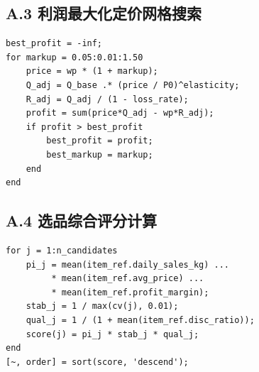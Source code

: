 \documentclass[12pt,a4paper]{ctexart}
\begin{document}
\subsection*{A.3 利润最大化定价网格搜索}
\begin{lstlisting}
best_profit = -inf;
for markup = 0.05:0.01:1.50
    price = wp * (1 + markup);
    Q_adj = Q_base .* (price / P0)^elasticity;
    R_adj = Q_adj / (1 - loss_rate);
    profit = sum(price*Q_adj - wp*R_adj);
    if profit > best_profit
        best_profit = profit;
        best_markup = markup;
    end
end
\end{lstlisting}

\subsection*{A.4 选品综合评分计算}
\begin{lstlisting}
for j = 1:n_candidates
    pi_j = mean(item_ref.daily_sales_kg) ...
         * mean(item_ref.avg_price) ...
         * mean(item_ref.profit_margin);
    stab_j = 1 / max(cv(j), 0.01);
    qual_j = 1 / (1 + mean(item_ref.disc_ratio));
    score(j) = pi_j * stab_j * qual_j;
end
[~, order] = sort(score, 'descend');
\end{lstlisting}
\end{document}

